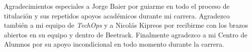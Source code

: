 Agradecimientos especiales a Jorge Baier por guiarme en todo el proceso de titulación y sus repetidos apoyos académicos durante mi carrera. Agradezco también a mi equipo de \textit{TechOps} y a Nicolás Kipreos por recibirme con los brazos abiertos en su equipo y dentro de Beetrack. Finalmente agradezco a mi Centro de Alumnos por su apoyo incondicional en todo momento durante la carrera.